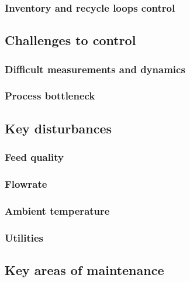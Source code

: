 \subsubsection{Inventory and recycle loops control}




\subsection{Challenges to control}

\subsubsection{Difficult measurements and dynamics} %

\subsubsection{Process bottleneck} %



\subsection{Key disturbances} %

\subsubsection{Feed quality}

\subsubsection{Flowrate}

\subsubsection{Ambient temperature}

\subsubsection{Utilities}


\subsection{Key areas of maintenance} %